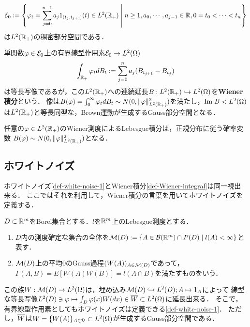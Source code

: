 \documentclass[uplatex,dvipdfmx]{jsreport}
\begin{document}
\begin{notation}
    \[\mathcal{E}_0:=\left\{\varphi_t=\sum^{n-1}_{j=0}a_j1_{(t_j,t_{j+1}]}(t)\in L^2(\mathbb{R}_+)\;\middle|\;n\ge 1,a_0,\cdots,a_{j-1}\in\mathbb{R},0=t_0<\cdots<t_n\right\}\]
    は$L^2(\mathbb{R}_+)$の稠密部分空間である．
\end{notation}

\begin{definition}\label{def-Wiener-integral}
    単関数$\varphi\in\mathcal{E}_0$上の有界線型作用素$\mathcal{E}_0\to L^2(\Omega)$
    \[\int_{\mathbb{R}_+}\varphi_tdB_t:=\sum^n_{j=0}a_j(B_{t_{j+1}}-B_{t_j})\]
    は等長写像であるが，この$L^2(\mathbb{R}_+)$への連続延長$B:L^2(\mathbb{R}_+)\hookrightarrow L^2(\Omega)$を\textbf{Wiener積分}という．
    像は$B(\varphi)=\int^\infty_0\varphi_tdB_t\sim N(0,\|\varphi\|^2_{L^2(\mathbb{R}_+)})$を満たし，$\mathrm{Im}\; B<L^2(\Omega)$は$L^2(\mathbb{R}_+)$と等長同型な，Brown運動が生成するGauss部分空間となる．
\end{definition}

\begin{lemma}
    任意の$\varphi\in L^2(\mathbb{R}_+)$のWiener測度によるLebesgue積分は，正規分布に従う確率変数
    $B(\varphi)\sim N(0,\|\varphi\|^2_{L^2(\mathbb{R}_+)})$となる．
\end{lemma}

\subsection{ホワイトノイズ}

\begin{tcolorbox}[colframe=ForestGreen, colback=ForestGreen!10!white,breakable,colbacktitle=ForestGreen!40!white,coltitle=black,fonttitle=\bfseries\sffamily,
title=]
    ホワイトノイズ\ref{def-white-noise-1}とWiener積分\ref{def-Wiener-integral}は同一視出来る．
    ここではそれを利用して，Wiener積分の言葉を用いてホワイトノイズを定義する．
\end{tcolorbox}

\begin{definition}
    $D\subset\mathbb{R}^m$をBorel集合とする．$l$を$\mathbb{R}^m$上のLebesgue測度とする．
    \begin{enumerate}
        \item $D$内の測度確定な集合の全体を$\mathcal{M}(D):=\left\{A\in\mathcal{B}(\mathbb{R}^m)\cap P(D)\mid l(A)<\infty\right\}$と表す．
        \item $\mathcal{M}(D)$上の平均$0$のGauss過程$(W(A))_{A\in\mathcal{M}(D)}$であって，$\Gamma(A,B)=E[W(A)W(B)]=l(A\cap B)$を満たすものをいう．
    \end{enumerate}
\end{definition}
\begin{remarks}
    この族$W:\mathcal{M}(D)\to L^2(\Omega)$は，埋め込み$\mathcal{M}(D)\hookrightarrow L^2(D);A\mapsto 1_A$によって
    線型な等長写像$L^2(D)\ni\varphi\mapsto\int_D\varphi(x)W(dx)\in\overline{W}\subset L^2(\Omega)$に延長出来る．
    そこで，有界線型作用素としてもホワイトノイズは定義できる\ref{def-white-noise-1}．
    ただし，$\overline{W}$は$W=\{W(A)\}_{A\in\mathcal{D}}\subset L^2(\Omega)$が生成するGauss部分空間である．
\end{remarks}
\end{document}

